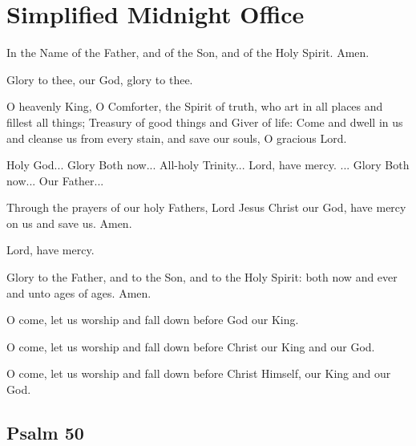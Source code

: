 \section{Simplified Midnight Office}

In the Name of the Father, and of the Son, and of the Holy Spirit. Amen.

Glory to thee, our God, glory to thee.

O heavenly King, O Comforter, the Spirit of truth, who art in all places and fillest all things; Treasury of good things and Giver of life: Come and dwell in us and cleanse us from every stain, and save our souls, O gracious Lord.

Holy God... Glory  Both now... All-holy Trinity... Lord, have mercy. ... Glory  Both now... Our Father...

Through the prayers of our holy Fathers, Lord Jesus Christ our God, have mercy on us and save us. Amen.

Lord, have mercy. 

Glory to the Father, and to the Son, and to the Holy Spirit: both now and ever and unto ages of ages. Amen.

O come, let us worship and fall down before God our King. 

O come, let us worship and fall down before Christ our King and our God. 

O come, let us worship and fall down before Christ Himself, our King and our God. 

\subsection{Psalm 50}

